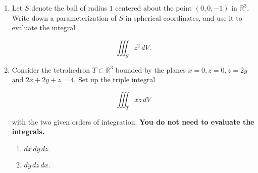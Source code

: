 \documentclass[12 pt]{report}
\begin{document}
\begin{enumerate}
\newpage

\item Let $S$ denote the ball of radius $1$ centered about the point $(0,0,-1)$ in $\mathbb{R}^3$. Write down a parameterization of $S$ in spherical coordinates, and use it to evaluate the integral 

\[
\iiint_S z^2 \, dV.
\]


\newpage


\item Consider the tetrahedron $T \subset \mathbb{R}^3$ bounded by the planes $x = 0, z = 0, z = 2y$ and $2x + 2y + z = 4$. Set up the triple integral 

\[
\iiint_T xz \, dV
\]

with the two given orders of integration. \textbf{You do not need to evaluate the integrals.}

\begin{enumerate} \item $dx \,dy \,dz.$
\vfill


\item $dy \, dz \, dx.$
\vfill
\end{enumerate}


%
%
%
%
%
%
%

\end{enumerate}
\end{document}
